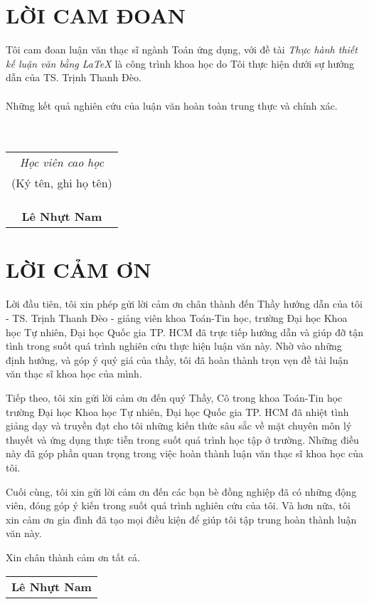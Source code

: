 \chapter*{LỜI CAM ĐOAN}
Tôi cam đoan luận văn thạc sĩ ngành Toán ứng dụng, với đề tài \emph{Thực hành thiết kế luận văn bằng \LaTeX} là công trình khoa học do Tôi thực hiện dưới sự hướng dẫn của TS. Trịnh Thanh Đèo. 
\\\\
Những kết quả nghiên cứu của luận văn hoàn toàn trung thực và chính xác.
\\\\\\
\begin{flushright}
	
	\begin{tabular}{@{}c@{}}
		\textit{Học viên cao học}\\
		(Ký tên, ghi họ tên)\\\\\\\\ 
        \textbf{Lê Nhựt Nam}
	\end{tabular}
	
\end{flushright}
\thispagestyle{empty}
\chapter*{LỜI CẢM ƠN}

Lời đầu tiên, tôi xin phép gửi lời cảm ơn chân thành đến Thầy hướng dẫn của tôi - TS. Trịnh Thanh Đèo - giảng viên khoa Toán-Tin học, trường Đại học Khoa học Tự nhiên, Đại học Quốc gia TP. HCM đã trực tiếp hướng dẫn và giúp đỡ tận tình trong suốt quá trình nghiên cứu thực hiện luận văn này. Nhờ vào những định hướng, và góp ý quý giá của thầy, tôi đã hoàn thành trọn vẹn đề tài luận văn thạc sĩ khoa học của mình.

Tiếp theo, tôi xin gửi lời cảm ơn đến quý Thầy, Cô trong khoa Toán-Tin học trường Đại học Khoa học Tự nhiên, Đại học Quốc gia TP. HCM đã nhiệt tình giảng dạy và truyền đạt cho tôi những kiến thức sâu sắc về mặt chuyên môn lý thuyết và ứng dụng thực tiễn trong suốt quá trình học tập ở trường. Những điều này đã góp phần quan trọng trong việc hoàn thành luận văn thạc sĩ khoa học của tôi.

Cuối cùng, tôi xin gửi lời cảm ơn đến các bạn bè đồng nghiệp đã có những động viên, đóng góp ý kiến trong suốt quá trình nghiên cứu của tôi. Và hơn nữa, tôi xin cảm ơn gia đình đã tạo mọi điều kiện để giúp tôi tập trung hoàn thành luận văn này.

Xin chân thành cảm ơn tất cả.
\begin{flushright}
		\begin{tabular}{@{}c@{}}
			\bfseries Lê Nhựt Nam
		\end{tabular}
\end{flushright}
\thispagestyle{empty}